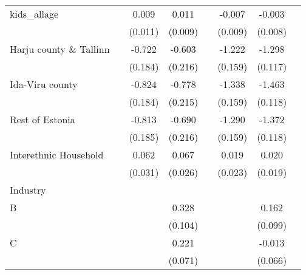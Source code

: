 {\begin{longtable}{l*{3}{c}|l*{3}{c}}
		kids\_allage         &                     &       0.009         &       0.011         &                     &      -0.007         &      -0.003         \\
		&                     &     (0.011)         &     (0.009)         &                     &     (0.009)         &     (0.008)         \\
		Harju county \& Tallinn&                     &      -0.722\sym{***}&      -0.603\sym{**} &                     &      -1.222\sym{***}&      -1.298\sym{***}\\
		&                     &     (0.184)         &     (0.216)         &                     &     (0.159)         &     (0.117)         \\
		Ida-Viru county   &                     &      -0.824\sym{***}&      -0.778\sym{***}&                     &      -1.338\sym{***}&      -1.463\sym{***}\\
		&                     &     (0.184)         &     (0.215)         &                     &     (0.159)         &     (0.118)         \\
		Rest of Estonia   &                     &      -0.813\sym{***}&      -0.690\sym{**} &                     &      -1.290\sym{***}&      -1.372\sym{***}\\
		&                     &     (0.185)         &     (0.216)         &                     &     (0.159)         &     (0.118)         \\
		Interethnic Household&                     &       0.062\sym{*}  &       0.067\sym{*}  &                     &       0.019         &       0.020         \\
		&                     &     (0.031)         &     (0.026)         &                     &     (0.023)         &     (0.019)         \\
		Industry &&&&&\\
		B                   &                     &                     &       0.328\sym{**} &                     &                     &       0.162         \\
		&                     &                     &     (0.104)         &                     &                     &     (0.099)         \\
		C                   &                     &                     &       0.221\sym{**} &                     &                     &      -0.013         \\
		&                     &                     &     (0.071)         &                     &                     &     (0.066)         \\

\end{longtable}}
